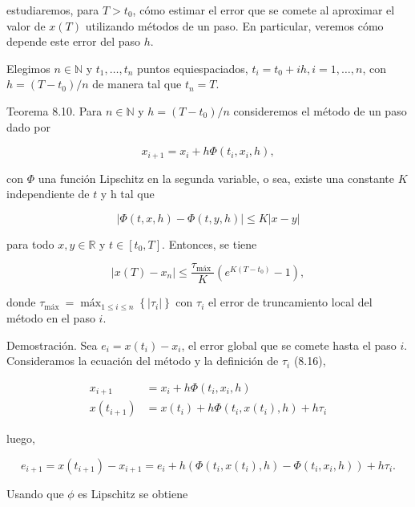 \documentclass[10pt]{article}
\begin{document}
estudiaremos, para $T>t_{0}$, cómo estimar el error que se comete al aproximar el valor de $x(T)$ utilizando métodos de un paso. En particular, veremos cómo depende este error del paso $h$.

Elegimos $n \in \mathbb{N}$ y $t_{1}, \ldots, t_{n}$ puntos equiespaciados, $t_{i}=t_{0}+i h, i=1, \ldots, n$, con $h=\left(T-t_{0}\right) / n$ de manera tal que $t_{n}=T$.

Teorema 8.10. Para $n \in \mathbb{N}$ y $h=\left(T-t_{0}\right) / n$ consideremos el método de un paso dado por

$$
x_{i+1}=x_{i}+h \Phi\left(t_{i}, x_{i}, h\right),
$$

con $\Phi$ una función Lipschitz en la segunda variable, o sea, existe una constante $K$ independiente de $t$ y h tal que


\begin{equation*}
|\Phi(t, x, h)-\Phi(t, y, h)| \leq K|x-y| \tag{8.19}
\end{equation*}


para todo $x, y \in \mathbb{R}$ y $t \in\left[t_{0}, T\right]$. Entonces, se tiene


\begin{equation*}
\left|x(T)-x_{n}\right| \leq \frac{\tau_{\text {máx }}}{K}\left(e^{K\left(T-t_{0}\right)}-1\right), \tag{8.20}
\end{equation*}


donde $\tau_{\text {máx }}=\operatorname{máx}_{1 \leq i \leq n}\left\{\left|\tau_{i}\right|\right\}$ con $\tau_{i}$ el error de truncamiento local del método en el paso $i$.

Demostración. Sea $e_{i}=x\left(t_{i}\right)-x_{i}$, el error global que se comete hasta el paso $i$.\\
Consideramos la ecuación del método y la definición de $\tau_{i}$ (8.16),

$$
\begin{aligned}
x_{i+1} & =x_{i}+h \Phi\left(t_{i}, x_{i}, h\right) \\
x\left(t_{i+1}\right) & =x\left(t_{i}\right)+h \Phi\left(t_{i}, x\left(t_{i}\right), h\right)+h \tau_{i}
\end{aligned}
$$

luego,

$$
e_{i+1}=x\left(t_{i+1}\right)-x_{i+1}=e_{i}+h\left(\Phi\left(t_{i}, x\left(t_{i}\right), h\right)-\Phi\left(t_{i}, x_{i}, h\right)\right)+h \tau_{i} .
$$

Usando que $\phi$ es Lipschitz se obtiene
\end{document}
